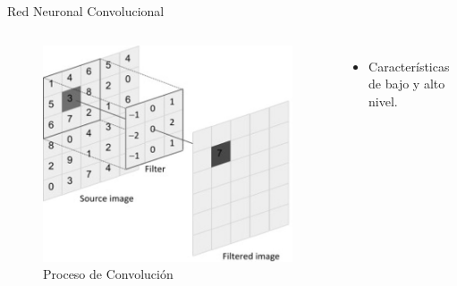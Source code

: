 \documentclass[12pt,aspectratio=169]{beamer}
\begin{document}
\begin{frame}{Red Neuronal Convolucional}
    \begin{columns}[c] 
            \begin{figure}
                \includegraphics[scale=0.4]{figs/conv_2d.jpg}
                \caption{Proceso de Convolución}
            \end{figure}
            \begin{itemize}
                \item Características de bajo y alto nivel.
                \vspace{4mm}
                

\end{itemize}
\end{columns}
\end{frame}
\end{document}
